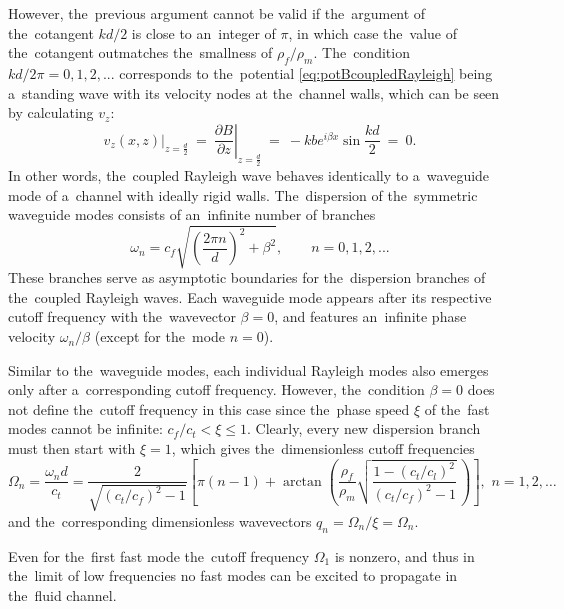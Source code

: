 However, the~previous argument cannot be valid if the~argument of the~cotangent $kd/2$ is close to an~integer of $\pi$, in which case the~value of the~cotangent outmatches the~smallness of $\rho_f/\rho_m$.
The~condition $kd/2\pi=0,1,2,...$ corresponds to the~potential \cref{eq:potBcoupledRayleigh} being a~standing wave with its velocity nodes at the~channel walls, which can be seen by calculating $v_z$:
\begin{equation}
\left.v_z(x,z)\right|_{z=\frac{d}{2}}~=~\left.\frac{\partial B}{\partial z}\right|_{z=\frac{d}{2}}~=~-kb e^{i\beta x}\sin{\frac{kd}{2}}~=~0.
\end{equation}
In other words, the~coupled Rayleigh wave behaves identically to a~waveguide mode of a~channel with ideally rigid walls.
The~dispersion of the~symmetric waveguide modes consists of an~infinite number of branches
\begin{equation}
\label{eq:waveguideRayleigh}
\omega_n=c_f\sqrt{\left(\frac{2\pi n}{d}\right)^2+\beta^2}, \qquad n=0,1,2,...
\end{equation}
These branches serve as asymptotic boundaries for the~dispersion branches of the~coupled Rayleigh waves.
Each waveguide mode appears after its respective cutoff frequency with the~wavevector $\beta=0$, and features an~infinite phase velocity $\omega_n/\beta$ (except for the~mode $n=0$).

Similar to the~waveguide modes, each individual Rayleigh modes also emerges only after a~corresponding cutoff frequency.
However, the~condition $\beta=0$ does not define the~cutoff frequency in this case since the~phase speed $\xi$ of the~fast modes cannot be infinite: $c_f/c_t < \xi \le 1$.
Clearly, every new dispersion branch must then start with $\xi=1$, which gives the~dimensionless cutoff frequencies
\begin{equation}
\label{eq:cutoffRayleigh}
\Omega_{n} = \frac{\omega_n d}{c_t}= \frac{2}{\sqrt{(c_t/c_f)^2 -1}} \left[ \pi \left(n-1\right) +
\arctan\left(\frac{\rho_f}{\rho_m} \sqrt{\frac{1-(c_t/c_l)^2}{(c_t/c_f)^2-1}}\, \right)\right] ,\,\, n = 1,2, \dots
\end{equation}
and the~corresponding dimensionless wavevectors $q_n = \Omega_n/\xi = \Omega_n$.

Even for the~first fast mode the~cutoff frequency $\Omega_1$ is nonzero, and thus in the~limit of low frequencies no fast modes can be excited to propagate in the~fluid channel.

